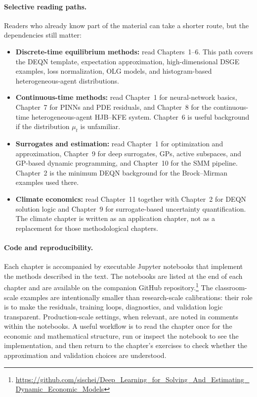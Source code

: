 \documentclass[11pt,a4paper]{report}
\begin{document}
\paragraph{Selective reading paths.}
Readers who already know part of the material can take a shorter route, but the dependencies still matter:
\begin{itemize}[itemsep=2pt]
\item \textbf{Discrete-time equilibrium methods:} read Chapters~1--6.  This path covers the DEQN template, expectation approximation, high-dimensional DSGE examples, loss normalization, OLG models, and histogram-based heterogeneous-agent distributions.
\item \textbf{Continuous-time methods:} read Chapter~1 for neural-network basics, Chapter~7 for PINNs and PDE residuals, and Chapter~8 for the continuous-time heterogeneous-agent HJB--KFE system.  Chapter~6 is useful background if the distribution $\mu_t$ is unfamiliar.
\item \textbf{Surrogates and estimation:} read Chapter~1 for optimization and approximation, Chapter~9 for deep surrogates, GPs, active subspaces, and GP-based dynamic programming, and Chapter~10 for the SMM pipeline.  Chapter~2 is the minimum DEQN background for the Brock--Mirman examples used there.
\item \textbf{Climate economics:} read Chapter~11 together with Chapter~2 for DEQN solution logic and Chapter~9 for surrogate-based uncertainty quantification.  The climate chapter is written as an application chapter, not as a replacement for those methodological chapters.
\end{itemize}

\paragraph{Code and reproducibility.}
Each chapter is accompanied by executable Jupyter notebooks that implement the methods described in the text.  The notebooks are listed at the end of each chapter and are available on the companion GitHub repository.\footnote{\url{https://github.com/sischei/Deep_Learning_for_Solving_And_Estimating_Dynamic_Economic_Models}}  The classroom-scale examples are intentionally smaller than research-scale calibrations: their role is to make the residuals, training loops, diagnostics, and validation logic transparent.  Production-scale settings, when relevant, are noted in comments within the notebooks.  A useful workflow is to read the chapter once for the economic and mathematical structure, run or inspect the notebook to see the implementation, and then return to the chapter's exercises to check whether the approximation and validation choices are understood.
\end{document}

